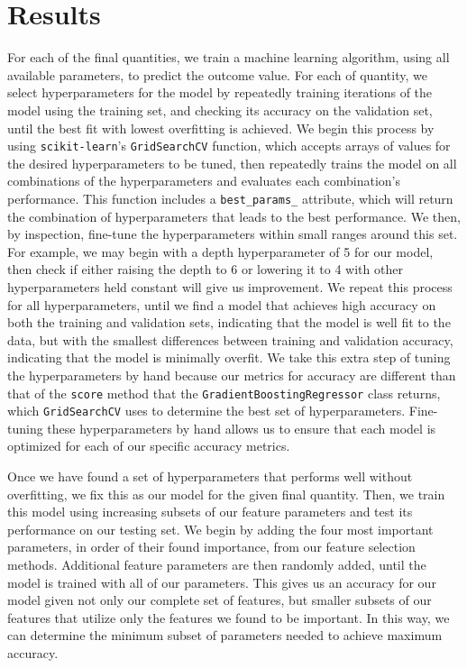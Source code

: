 \documentclass[fleqn,usenatbib]{mnras}
\begin{document}
\section{Results}
\label{sec:Results}
For each of the final quantities, we train a machine learning algorithm, using all available parameters, to predict the outcome value. For each of quantity, we select hyperparameters for the model by repeatedly training iterations of the model using the training set, and checking its accuracy on the validation set, until the best fit with lowest overfitting is achieved. We begin this process by using \texttt{scikit-learn}'s \texttt{GridSearchCV} function, which accepts arrays of values for the desired hyperparameters to be tuned, then repeatedly trains the model on all combinations of the hyperparameters and evaluates each combination's performance. This function includes a \texttt{best\_params\_} attribute, which will return the combination of hyperparameters that leads to the best performance. We then, by inspection, fine-tune the hyperparameters within small ranges around this set. For example, we may begin with a depth hyperparameter of 5 for our model, then check if either raising the depth to 6 or lowering it to 4 with other hyperparameters held constant will give us improvement. We repeat this process for all hyperparameters, until we find a model that achieves high accuracy on both the training and validation sets, indicating that the model is well fit to the data, but with the smallest differences between training and validation accuracy, indicating that the model is minimally overfit. We take this extra step of tuning the hyperparameters by hand because our metrics for accuracy are different than that of the \texttt{score} method that the \texttt{GradientBoostingRegressor} class returns, which \texttt{GridSearchCV} uses to determine the best set of hyperparameters. Fine-tuning these hyperparameters by hand allows us to ensure that each model is optimized for each of our specific accuracy metrics.

Once we have found a set of hyperparameters that performs well without overfitting, we fix this as our model for the given final quantity. Then, we train this model using increasing subsets of our feature parameters and test its performance on our testing set. We begin by adding the four most important parameters, in order of their found importance, from our feature selection methods. Additional feature parameters are then randomly added, until the model is trained with all of our parameters. This gives us an accuracy for our model given not only our complete set of features, but smaller subsets of our features that utilize only the features we found to be important. In this way, we can determine the minimum subset of parameters needed to achieve maximum accuracy. 
\end{document}
